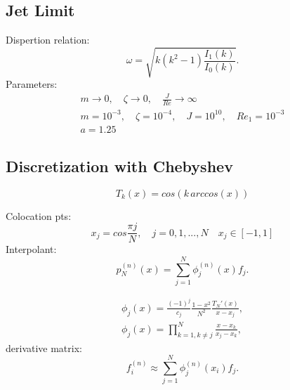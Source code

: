 \subsection*{Jet Limit}

Dispertion relation:
\begin{equation*}
 \omega = \sqrt{ k  (k^2 - 1) \frac{I_1(k)}{I_0(k)} }.
\end{equation*}
Parameters:
\begin{eqnarray*}
 m \rightarrow 0, \quad \zeta \rightarrow 0, \quad \frac{J}{Re}\rightarrow \infty \\
 m = 10^{-3}, \quad \zeta = 10^{-4}, \quad J=10^{10}, \quad Re_1=10^{-3} \\ a=1.25
\end{eqnarray*}

\subsection*{Discretization with Chebyshev}
\begin{equation*}
 T_k (x) = cos(k \, arccos(x))
\end{equation*}

Colocation pts:
\begin{equation*}
 x_j=cos\frac{\pi j}{N},\quad j=0,1,...,N \quad x_j\in[-1,1]
\end{equation*}
Interpolant:
\begin{equation*}
 p_N^{(n)}(x)=\sum_{j=1}^N \phi_j^{(n)}(x) f_j.
\end{equation*}

\begin{eqnarray*}
 \phi_j(x) = \frac{(-1)^j}{c_j} \frac{1-x^2}{N^2} \frac{T_N ' (x)}{x-x_j}, \\
 \phi_j(x) = \prod_{k=1,k\ne j}^N \frac{x-x_k}{x_j-x_k},
\end{eqnarray*}
derivative matrix:
\begin{equation*}
 f^{(n)}_i \approx \sum \limits_{j=1}^N \phi_j^{(n)}(x_i) f_j.
\end{equation*}

